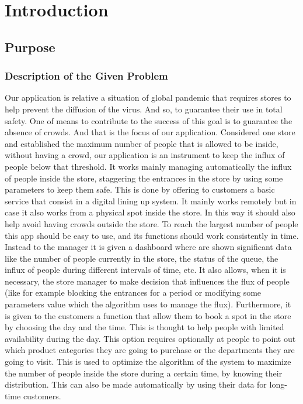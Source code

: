 \chapter{Introduction}

\section{Purpose}

\subsection{Description of the Given Problem}

Our application is relative a situation of global pandemic that requires stores to help prevent the diffusion of the virus. And so, to guarantee their use in total safety. One of means to contribute to the success of this goal is to guarantee the absence of crowds. And that is the focus of our application.
Considered one store and established the maximum number of people that is allowed to be inside, without having a crowd, our application is an instrument to keep the influx of people below that threshold.
It works mainly managing automatically the influx of people inside the store, staggering the entrances in the store by using some parameters to keep them safe.
This is done by offering to customers a basic service that consist in a digital lining up system. It mainly works remotely but in case it also works from a physical spot inside the store. In this way it should also help avoid having crowds outside the store. To reach the largest number of people this app should be easy to use, and its functions should work consistently in time. 
Instead to the manager it is given a dashboard where are shown significant data like the number of people currently in the store, the status of the queue, the influx of people during different intervals of time, etc. It also allows, when it is necessary, the store manager to make decision that influences the flux of people (like for example blocking the entrances for a period or modifying some parameters value which the algorithm uses to manage the flux). 
Furthermore, it is given to the customers a function that allow them to book a spot in the store by choosing the day and the time. This is thought to help people with limited availability during the day.
This option requires optionally at people to point out which product categories they are going to purchase or the departments they are going to visit. This is used to optimize the algorithm of the system to maximize the number of people inside the store during a certain time, by knowing their distribution. This can also be made automatically by using their data for long-time customers.


